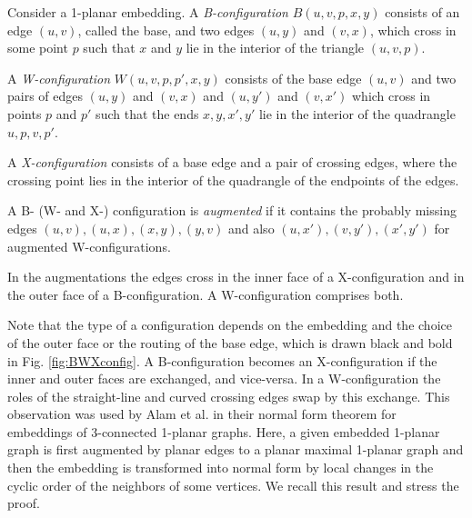 \documentclass[runningheads]{llncs}
\begin{document}
\begin{definition}
Consider a 1-planar embedding.
 A \textit{B-configuration}
$B(u,v,p, x,y)$ consists of an edge $(u,v)$, called the base, and
two edges $(u, y)$ and $(v,x)$, which cross in some point $p$ such
that $x$ and $y$ lie in the interior of the triangle $(u, v, p)$.

A \textit{W-configuration} $W(u,v,p,p', x,y)$ consists of the base
edge $(u,v)$ and two pairs of edges $(u, y)$ and $(v, x)$ and $(u,
y')$ and $(v,x')$ which cross in points $p$ and $p'$ such that the
ends $x,y,x',y'$ lie in the interior of the quadrangle $u, p, v,
p'$.

A \textit{X-configuration} consists of a base edge and a pair of
crossing edges, where the crossing point lies in the interior of the
quadrangle of the endpoints of the edges.


A B- (W- and X-) configuration is \textit{augmented} if it contains
the probably missing  edges $(u,v), (u,x), (x,y), (y,v)$ and also
$(u, x'), (v,y'), (x', y')$ for augmented W-configurations.
\end{definition}


In the augmentations the edges cross in the inner face of a
X-configuration and in the outer face of a B-configuration. A
W-configuration comprises both.

\iffalse

 A B-configuration consists of a base edge (on the left) and
the end vertices of the crossed edges are inside the triangle of the
base edge and the half-edges to the crossing point.  In an
X-crossing the end vertices are in the exterior. A W-configuration
comprises a B- and an X-configuration. Recall that we consider
planar maximal graphs, where each crossing induces a $K_4$ for the
endpoints of each pair of crossing edges, and these edges are added
in the \emph{augmentation}  if they were missing. Then the crossing
point is in the exterior in a B-configuration and in the interior in
a X-configuration. See also \cite{t-rdg-88} and \cite{abk-sld3c-13}.

\fi


 Note that the type of a configuration depends on the
embedding and the choice of the outer face or the routing of the
 base edge, which is drawn black and bold in Fig.
\ref{fig:BWXconfig}. A B-configuration becomes an X-configuration if
the inner and outer faces are exchanged, and vice-versa. In a
W-configuration the roles of the straight-line and curved crossing
edges swap by this exchange.
 This observation was used by Alam et al. \cite{abk-sld3c-13} in
their normal form theorem for embeddings of 3-connected 1-planar
graphs. Here, a given embedded 1-planar graph is first augmented by
planar edges to a planar maximal 1-planar graph and then the
embedding is transformed into normal form by local changes in the
cyclic order of the neighbors of some vertices. We recall this
result and stress the proof.
\end{document}
